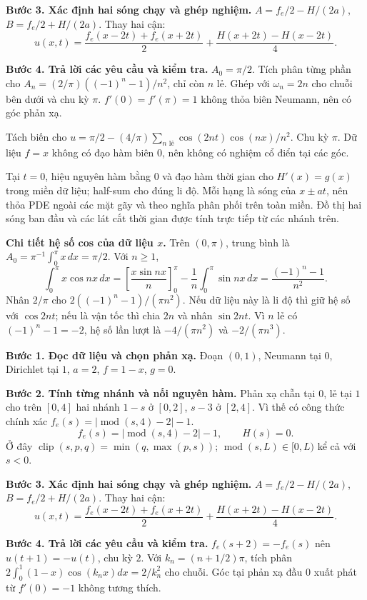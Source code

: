 \textbf{Bước 3. Xác định hai sóng chạy và ghép nghiệm.} $A=f_e/2-H/(2a)$, $B=f_e/2+H/(2a)$. Thay hai cận:
\[u(x,t)=\frac{f_e(x-2t)+f_e(x+2t)}2+\frac{H(x+2t)-H(x-2t)}{4}.\]

\textbf{Bước 4. Trả lời các yêu cầu và kiểm tra.} $A_0=\pi/2$. Tích phân từng phần cho $A_n=(2/\pi)((-1)^n-1)/n^2$, chỉ còn $n$ lẻ. Ghép với $\omega_n=2n$ cho chuỗi bên dưới và chu kỳ $\pi$. $f'(0)=f'(\pi)=1$ không thỏa biên Neumann, nên có góc phản xạ.

Tách biến cho $u=\pi/2-(4/\pi)\sum_{n\text{ lẻ}}\cos(2nt)\cos(nx)/n^2$. Chu kỳ $\pi$. Dữ liệu $f=x$ không có đạo hàm biên 0, nên không có nghiệm cổ điển tại các góc.

Tại $t=0$, hiệu nguyên hàm bằng $0$ và đạo hàm thời gian cho $H'(x)=g(x)$ trong miền dữ liệu; half-sum cho đúng li độ. Mỗi hạng là sóng của $x\pm at$, nên thỏa PDE ngoài các mặt gãy và theo nghĩa phân phối trên toàn miền. Đồ thị hai sóng ban đầu và các lát cắt thời gian được tính trực tiếp từ các nhánh trên.

\textbf{Chi tiết hệ số cos của dữ liệu $x$.} Trên $(0,\pi)$, trung bình là $A_0=\pi^{-1}\int_0^\pi x\,dx=\pi/2$. Với $n\ge1$,
\[\int_0^\pi x\cos nx\,dx=\left[\frac{x\sin nx}{n}\right]_0^\pi-\frac1n\int_0^\pi\sin nx\,dx
=\frac{(-1)^n-1}{n^2}.\]
Nhân $2/\pi$ cho $2((-1)^n-1)/(\pi n^2)$. Nếu dữ liệu này là li độ thì giữ hệ số với $\cos2nt$; nếu là vận tốc thì chia $2n$ và nhân $\sin2nt$. Vì $n$ lẻ có $(-1)^n-1=-2$, hệ số lần lượt là $-4/(\pi n^2)$ và $-2/(\pi n^3)$.

\textbf{Bước 1. Đọc dữ liệu và chọn phản xạ.} Đoạn $(0,1)$, Neumann tại $0$, Dirichlet tại $1$, $a=2$, $f=1-x$, $g=0$.

\textbf{Bước 2. Tính từng nhánh và nối nguyên hàm.} Phản xạ chẵn tại $0$, lẻ tại $1$ cho trên $[0,4]$ hai nhánh $1-s$ ở $[0,2]$, $s-3$ ở $[2,4]$. Vì thế có công thức chính xác $f_e(s)=|\operatorname{mod}(s,4)-2|-1$.
\[f_e(s)=|\operatorname{mod}(s,4)-2|-1,\qquad H(s)=0.\]
Ở đây $\operatorname{clip}(s,p,q)=\min(q,\max(p,s))$; $\operatorname{mod}(s,L)\in[0,L)$ kể cả với $s<0$.

\textbf{Bước 3. Xác định hai sóng chạy và ghép nghiệm.} $A=f_e/2-H/(2a)$, $B=f_e/2+H/(2a)$. Thay hai cận:
\[u(x,t)=\frac{f_e(x-2t)+f_e(x+2t)}2+\frac{H(x+2t)-H(x-2t)}{4}.\]

\textbf{Bước 4. Trả lời các yêu cầu và kiểm tra.} $f_e(s+2)=-f_e(s)$ nên $u(t+1)=-u(t)$, chu kỳ $2$. Với $k_n=(n+1/2)\pi$, tích phân $2\int_0^1(1-x)\cos(k_nx)dx=2/k_n^2$ cho chuỗi. Góc tại phản xạ đầu $0$ xuất phát từ $f'(0)=-1$ không tương thích.

